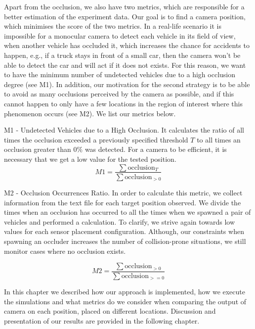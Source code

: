 Apart from the occlusion, we also have two metrics, which are responsible for a better estimation of the experiment data. Our goal is to find a camera position, which minimises the score of the two metrics. In a real-life scenario it is impossible for a monocular camera to detect each vehicle in its field of view, when another vehicle has occluded it, which increases the chance for accidents to happen, e.g., if a truck stays in front of a small car, then the camera won't be able to detect the car and will act if it does not exists. For this reason, we want to have the minimum number of undetected vehicles due to a high occlusion degree (see M1). In addition, our motivation for the second strategy is to be able to avoid as many occlusions perceived by the camera as possible, and if this cannot happen to only have a few locations in the region of interest where this phenomenon occurs (see M2). We list our metrics below.

M1 - Undetected Vehicles due to a High Occlusion. It calculates the ratio of all times the occlusion exceeded a previously specified threshold $T$ to all times an occlusion greater than $0\%$ was detected. For a camera to be efficient, it is necessary that we get a low value for the tested position.
\begin{equation}
   M1 = \frac{\sum\textrm{occlusion}_{T}}{\sum\textrm{occlusion}_{>0}}
\end{equation}

M2 - Occlusion Occurrences Ratio. In order to calculate this metric, we collect information from the text file for each target position observed. We divide the times when an occlusion has occurred to all the times when we spawned a pair of vehicles and performed a calculation. To clarify, we strive again towards low values for each sensor placement configuration. Although, our constraints when spawning an occluder increases the number of collision-prone situations, we still monitor cases where no occlusion exists.  

\begin{equation}
    M2 = \frac{\sum\textrm{occlusion}_{>0}}{\sum\textrm{occlusion}_{>=0}}
\end{equation}

In this chapter we described how our approach is implemented, how we execute the simulations and what metrics do we consider when comparing the output of camera on each position, placed on different locations. Discussion and presentation of our results are provided in the following chapter.